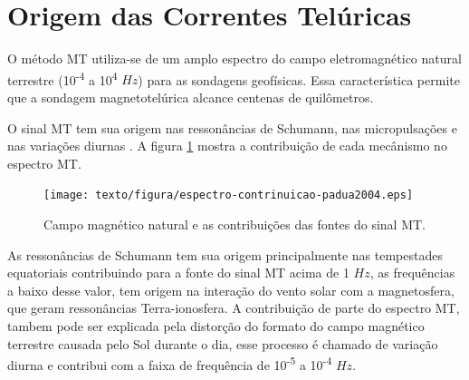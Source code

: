     \section{Origem das Correntes Telúricas}
    
        O método MT utiliza-se de um amplo espectro do campo eletromagnético natural terrestre (10\textsuperscript{-4} a 10\textsuperscript{4} $Hz$) para as sondagens geofísicas. Essa característica permite que  a sondagem magnetotelúrica alcance centenas de quilômetros.
        
        O sinal MT tem sua origem nas ressonâncias de Schumann, nas micropulsações e nas variações diurnas \cite{padua2004estudos}. A figura \ref{sinalmt} mostra a contribuição de cada mecânismo no espectro MT.
        
        \begin{figure}[H]
            \caption{Campo magnético natural e as contribuições das fontes do sinal MT.}
                \begin{center}
                    \texttt{[image: texto/figura/espectro-contrinuicao-padua2004.eps]}
                \end{center}
            \label{sinalmt}
        \end{figure}
        
        As ressonâncias de Schumann tem sua origem principalmente nas tempestades equatoriais contribuindo para a fonte do sinal MT acima de 1 $Hz$, as frequências a baixo desse valor, tem origem na interação do vento solar com a magnetosfera, que geram ressonâncias Terra-ionosfera. A contribuição de parte do espectro MT, tambem pode ser explicada pela distorção do formato do campo magnético terrestre causada pelo Sol durante o dia, esse processo é chamado de variação diurna e contribui com a faixa de frequência de 10\textsuperscript{-5} a 10\textsuperscript{-4} $Hz$. 
        
        
        
        
        
